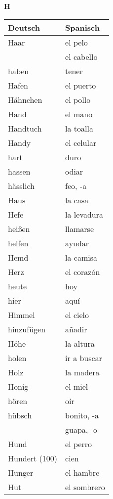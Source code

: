 \begin{flushright}\begin{Huge}\textbf{H}\end{Huge}\end{flushright}

\begin{longtable}{p{} p{}} 
\textbf{Deutsch}     & \textbf{Spanisch}                                       \\ \hline
\hline
\endhead %
Haar & el pelo\\
~ & el cabello\\
haben & tener\\
Hafen & el puerto\\
Hähnchen & el pollo\\
Hand & el mano\\
Handtuch & la toalla\\
Handy & el celular\\
hart & duro\\
hassen & odiar\\
hässlich & feo, -a\\
Haus & la casa\\
Hefe & la levadura\\
heißen & llamarse\\
helfen & ayudar\\
Hemd & la camisa\\
Herz  & el corazón \\
heute & hoy\\
hier & aquí\\
Himmel & el cielo\\
hinzufügen & añadir\\
Höhe & la altura \\
holen & ir a buscar\\
Holz & la madera\\
Honig & el miel\\
hören & oír\\
hübsch & bonito, -a\\
~ & guapa, -o\\
Hund & el perro\\
Hundert (100) & cien\\
Hunger & el hambre\\
Hut & el sombrero\\

\end{longtable}

